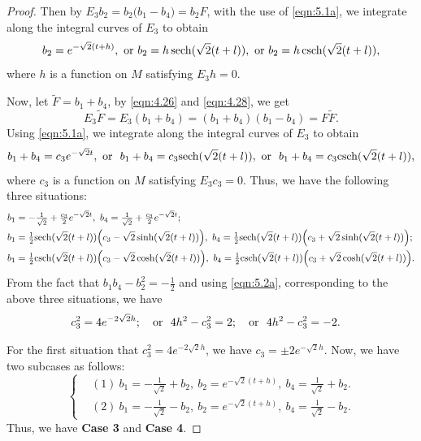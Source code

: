 \documentclass[reqno]{amsart}%
\theoremstyle{definition}
\numberwithin{equation}{section}
\begin{document}
\begin{proof}
Then by $E_3b_2=b_2\big(b_1-b_4\big)=b_2F$, with the use of \eqref{eqn:5.1a}, we integrate along the integral curves of $E_3$
to obtain
\begin{equation}\label{eqn:5.2a}
b_2=e^{-\sqrt{2}(t+h)}, \ {\rm or}\ b_2=h\, {\rm sech}(\sqrt{2}(t+l)),
\ {\rm or}\ b_2=h\, {\rm csch}(\sqrt{2}(t+l)),
\end{equation}
where $h$ is a function on $M$ satisfying $E_3h=0$.

Now, let $\tilde{F}=b_1+b_4$, by \eqref{eqn:4.26} and \eqref{eqn:4.28}, we get
$$
E_3\tilde{F}=E_3(b_1+b_4)=(b_1+b_4)(b_1-b_4)=F\tilde{F}.
$$
Using \eqref{eqn:5.1a}, we integrate along the integral curves of $E_3$
to obtain
$$
b_1+b_4=c_3e^{-\sqrt{2}t}, \ {\rm or}\ \ b_1+b_4=c_3{\rm sech}(\sqrt{2}(t+l)),
\ {\rm or}\ \ b_1+b_4=c_3{\rm csch}(\sqrt{2}(t+l)),
$$
where $c_3$ is a function on $M$ satisfying $E_3c_3=0$. Thus, we have the following three situations:
$$
\begin{aligned}
&b_1=-\tfrac{1}{\sqrt{2}}+\tfrac{c_3}{2}e^{-\sqrt{2}t},\ b_4=\tfrac{1}{\sqrt{2}}+\tfrac{c_3}{2}e^{-\sqrt{2}t};\\
&b_1=\tfrac{1}{2}{\rm sech}(\sqrt{2}(t+l))\Big(c_3-\sqrt{2}\sinh(\sqrt{2}(t+l))\Big),\
b_4=\tfrac{1}{2}{\rm sech}(\sqrt{2}(t+l))\Big(c_3+\sqrt{2}\sinh(\sqrt{2}(t+l))\Big);\\
&b_1=\tfrac{1}{2}{\rm csch}(\sqrt{2}(t+l))\Big(c_3-\sqrt{2}\cosh(\sqrt{2}(t+l))\Big),\
b_4=\tfrac{1}{2}{\rm csch}(\sqrt{2}(t+l))\Big(c_3+\sqrt{2}\cosh(\sqrt{2}(t+l))\Big).
\end{aligned}
$$
From the fact that $b_1b_4-b_2^2=-\frac{1}{2}$ and using \eqref{eqn:5.2a},
corresponding to the above three situations, we have
$$
\begin{aligned}
&c_3^2=4e^{-2\sqrt{2}h};\ \ \ {\rm or}\ \ 4h^2-c_3^2=2;\ \ \ {\rm or}\ \ 4h^2-c_3^2=-2.
\end{aligned}
$$

For the first situation that $c_3^2=4e^{-2\sqrt{2}h}$, we have $c_3=\pm2e^{-\sqrt{2}h}$.
Now, we have two subcases as follows:
\begin{equation*}
\left\{
\begin{aligned}
&(1)\ b_1=-\tfrac{1}{\sqrt{2}}+b_2,\ b_2=e^{-\sqrt{2}(t+h)},\ b_4=\tfrac{1}{\sqrt{2}}+b_2.\\
&(2)\ b_1=-\tfrac{1}{\sqrt{2}}-b_2,\ b_2=e^{-\sqrt{2}(t+h)},\ b_4=\tfrac{1}{\sqrt{2}}-b_2.
\end{aligned}\right.
\end{equation*}
Thus, we have {\bf Case 3} and {\bf Case 4}.


\end{proof}
\end{document}
